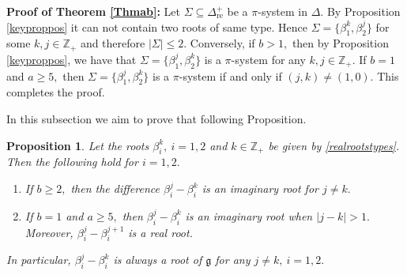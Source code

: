 \documentclass[12pt,reqno]{amsart}
\theoremstyle{plain}
\newtheorem{prop}{Proposition}
\theoremstyle{definition}
\theoremstyle{remark}
\newcommand{\lie}[1]{\mathfrak{#1}}
\newcommand\bz{\mathbb Z}
\begin{document}
\noindent \textbf{Proof of Theorem \ref{Thmab}:}
     Let $\Sigma\subseteq \Delta^+_{\mathrm{re}}$ be a $\pi$-system in $\Delta.$ By Proposition \ref{keyproppos} it can not contain two roots of same type. Hence $\Sigma=\{\beta_1^k,\beta_2^j\}$ for some $k,j\in\bz_+$ and therefore $|\Sigma|\le 2.$ Conversely, if $b>1,$ then by Proposition \ref{keyproppos}, we have that $\Sigma=\{\beta_1^j,\beta_2^k\}$ is a $\pi$-system for any $k,j\in\bz_+.$ If $b=1$ and $a\geq 5,$ then $\Sigma=\{\beta_1^j,\beta_2^k\}$ is a $\pi$-system if and only if $(j,k)\neq (1,0).$ This completes the proof.



\iffalse
\hrulefill\vspace{10pt}

In this subsection we aim to prove that following Proposition. %
\begin{prop}\label{propsamediffim}
    Let the roots $\beta_{i}^{k},\ i=1,2$ and $k\in \bz_+$ be given by \ref{realrootstypes}. Then the following hold for $i=1,2.$
    \begin{enumerate}
        \item If $b\geq 2,$ then the difference $\beta_{i}^{j}-\beta_{i}^{k}$ is an imaginary root for $j\neq k.$
        \item If $b=1$ and $a\geq 5,$ then $\beta_{i}^{j}-\beta_{i}^{k}$ is an imaginary root when $|j-k|>1.$ Moreover, $\beta_{i}^{j}-\beta_{i}^{j+1}$ is a real root.
    \end{enumerate}
    In particular, $\beta_{i}^{j}-\beta_{i}^{k}$ is always a root of $\lie g$ for any $j\neq k,\ i=1,2.$
\end{prop}

    
\end{document}
